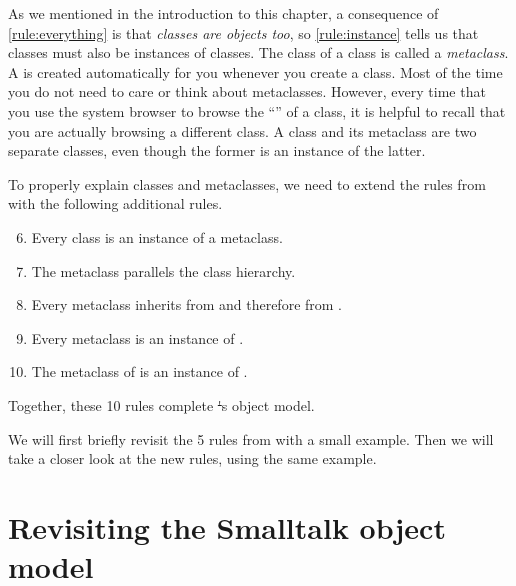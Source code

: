\documentclass[a4paper,10pt,twoside]{book}
\begin{document}
As we mentioned in the introduction to this chapter, a consequence of \ref{rule:everything} is that \emph{classes are objects too}, so \ref{rule:instance} tells us that classes must also be instances of classes.
The class of a class is called a \emph{metaclass}.
\label{sec:metaclassIntro}
A  is created automatically for you whenever you create a class.
Most of the time you do not need to care or think about metaclasses.
However, every time that you use the system browser to browse the ``'' of a class, it is helpful to recall that you are actually browsing a different class.
A class and its metaclass are two separate classes, even though the former is an instance of the latter. 

To properly explain classes and metaclasses, we need to extend the rules from  with the following additional rules.

\begin{enumerate}[label={\textbf{Rule \arabic{*}}.}, ref={Rule \arabic{*}}, leftmargin=*, widest=10]
\setcounter{enumi}{5}
\item{} \label{rule:metaclass}
	Every class is an instance of a metaclass.

\item{} \label{rule:parallelhierarchy}
	The metaclass  parallels the class hierarchy.

\item{} \label{rule:behavior}
	Every metaclass inherits from  and therefore from .

\item{} \label{rule:metaclassclass}
	Every metaclass is an instance of .

\item{} \label{rule:metaclassmetaclass}
	The metaclass of  is an instance of .

\end{enumerate}

\noindent
Together, these 10 rules complete \st's object model.

We will first briefly revisit the 5 rules from  with a small example.
Then we will take a closer look at the new rules, using the same example.

\section{Revisiting the Smalltalk object model}
\end{document}

